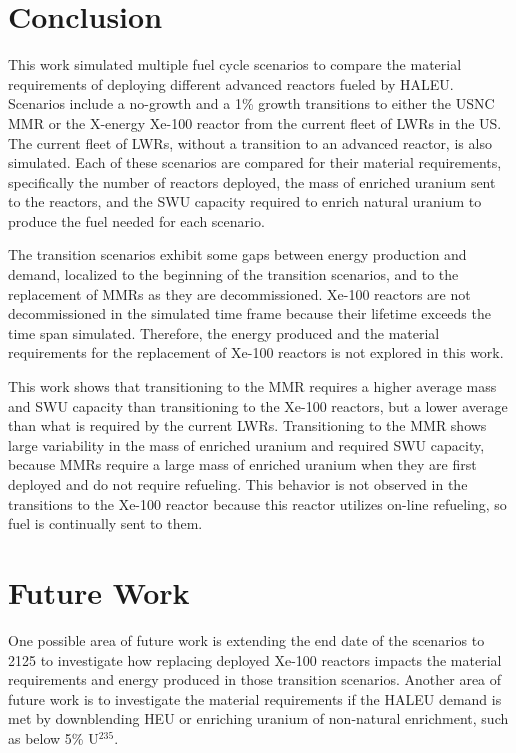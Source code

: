 \section{Conclusion}
This work simulated multiple fuel cycle scenarios to compare the 
material requirements of deploying different advanced reactors fueled 
by \gls{HALEU}. Scenarios include a no-growth and a 1\% growth 
transitions to either the \gls{USNC} \gls{MMR} or the X-energy Xe-100 
reactor from the current fleet of \glspl{LWR} in the US. The current 
fleet of \glspl{LWR}, without a transition to an advanced reactor, is 
also simulated. Each of these scenarios are compared for their material 
requirements, specifically the number of reactors deployed, the mass 
of enriched uranium sent to the reactors, and the \gls{SWU} capacity 
required to enrich natural uranium to produce the fuel needed for 
each scenario. 

The transition scenarios exhibit some gaps between  
energy production and demand, localized to the beginning of the 
transition
scenarios, and to the replacement of \glspl{MMR} as they are decommissioned. 
Xe-100 reactors are not decommissioned in the simulated time frame because 
their lifetime exceeds the time span simulated. Therefore, the 
energy produced and the material requirements for the replacement of 
Xe-100 reactors is not explored in this work. 

This work shows that transitioning to the \gls{MMR} requires 
a higher average mass and \gls{SWU} capacity than transitioning to the 
Xe-100 reactors, but a lower average than what is required by the current 
\glspl{LWR}. Transitioning to the \gls{MMR} shows large variability in 
the mass of enriched uranium and required \gls{SWU} capacity, because 
\glspl{MMR} require a large mass of enriched uranium when they are 
first deployed and do not require refueling. This behavior is not observed 
in the transitions to the Xe-100 reactor because this reactor utilizes 
on-line refueling, so fuel is continually sent to them. 

\section{Future Work}
One possible area of future work is extending the end date 
of the scenarios to 2125 to investigate how replacing deployed Xe-100 
reactors impacts the material requirements and energy produced in those 
transition scenarios. Another area of future work is to investigate the 
material requirements if the \gls{HALEU} demand is met by downblending 
\gls{HEU} or enriching uranium of non-natural enrichment, such as 
 below 5\% U$^{235}$.  
